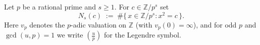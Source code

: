 
\begin{definition}\label{lem-3-2-6-cardSqrts}
  \leanok
  Let $p$ be a rational prime and $s \geq 1$. For $c \in \mathbb{Z}/p^s$ set
  \[
    N_s(c) \;:=\; \#\{\, x \in \mathbb{Z}/p^s : x^2 = c \,\}.
  \]
  Here $v_p$ denotes the $p$-adic valuation on $\mathbb{Z}$ (with $v_p(0) = \infty$),
  and for odd $p$ and $\gcd(u,p) = 1$ we write $\left(\frac{u}{p}\right)$ for the
  Legendre symbol.
\end{definition}

